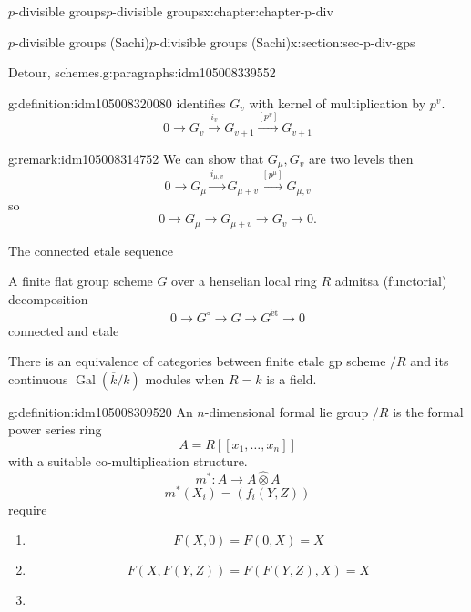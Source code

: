 \documentclass[oneside,10pt,]{book}
\numberwithin{equation}{section}
\newcommand{\lb}{[}
\newcommand{\rb}{]}
\newcommand{\et}{\mathrm{\acute{e}t}}
\newcommand{\absgal}[1]{\operatorname{Gal}(\overline{#1}/#1)}
\begin{document}
\begin{chapterptx}{\(p\)-divisible groups}{}{\(p\)-divisible groups}{}{}{x:chapter:chapter-p-div}
\begin{sectionptx}{\(p\)-divisible groups (Sachi)}{}{\(p\)-divisible groups (Sachi)}{}{}{x:section:sec-p-div-gps}
\begin{paragraphs}{Detour, schemes.}{g:paragraphs:idm105008339552}
\begin{definition}{}{g:definition:idm105008320080}
identifies \(G_v\) with kernel of multiplication by \(p^v\).%
\begin{equation*}
0 \to G_v \xrightarrow{i_v} G_{v+1} \xrightarrow{[p^v]} G_{v+1}
\end{equation*}
%
\end{definition}
\begin{remark}{}{g:remark:idm105008314752}%
We can show that \(G_\mu,G_v\) are two levels then%
\begin{equation*}
0 \to G_\mu \xrightarrow{i_{\mu, v}} G_{\mu +v } \xrightarrow{[p^\mu]} G_{\mu,v}
\end{equation*}
so%
\begin{equation*}
0 \to G_\mu \to G_{\mu + v}  \to G_v \to 0\text{.}
\end{equation*}
%
\end{remark}
The connected etale sequence%
\par
A finite flat group scheme \(G\) over a henselian local ring \(R\) admitsa (functorial) decomposition%
\begin{equation*}
0  \to G^\circ \to G \to G^\et \to 0
\end{equation*}
connected and etale%
\par
There is an equivalence of categories between finite etale gp scheme \(/R\) and its continuous \(\absgal k\) modules when \(R = k\) is a field.%
\begin{definition}{}{g:definition:idm105008309520}%
An \(n\)-dimensional formal lie group \(/R\) is the formal power series ring%
\begin{equation*}
A = R\lb \lb x_1, \ldots, x_n \rb\rb
\end{equation*}
with a suitable co-multiplication structure.%
\begin{equation*}
m^* \colon A \to A\widehat \otimes A
\end{equation*}
%
\begin{equation*}
m^*(X_i) = (f_i(Y,Z))
\end{equation*}
require%
\begin{enumerate}
\item{}%
\begin{equation*}
F(X,0) = F(0,X) = X
\end{equation*}
%
\item{}%
\begin{equation*}
F(X,F(Y,Z)) = F(F(Y,Z),X) = X
\end{equation*}
%
\item{}%
\begin{equation*}

\end{equation*}
\end{enumerate}
\end{definition}
\end{paragraphs}
\end{sectionptx}
\end{chapterptx}
\end{document}

